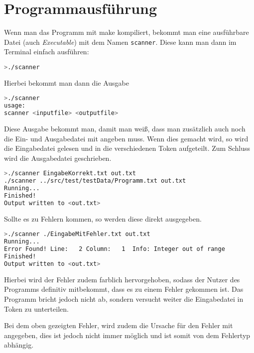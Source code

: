 \section{Programmausführung}
Wenn man das Programm mit make kompiliert, bekommt man eine ausführbare Datei (auch \textit{Executable}) mit dem Namen \texttt{scanner}. Diese kann man dann im Terminal einfach ausführen:

\begin{lstlisting}[language=bash,numbers=none]
>./scanner
\end{lstlisting}

Hierbei bekommt man dann die Ausgabe

\begin{lstlisting}[language=bash,numbers=none]
>./scanner
usage:
scanner <inputfile> <outputfile>
\end{lstlisting}

Diese Ausgabe bekommt man, damit man weiß, dass man zusätzlich auch noch die Ein- und Ausgabedatei mit angeben muss. Wenn dies gemacht wird, so wird die Eingabedatei gelesen und in die verschiedenen Token aufgeteilt. Zum Schluss wird die Ausgabedatei geschrieben.

\begin{lstlisting}[language=bash,numbers=none]
>./scanner EingabeKorrekt.txt out.txt
./scanner ../src/test/testData/Programm.txt out.txt
Running...
Finished!
Output written to <out.txt>
\end{lstlisting}

Sollte es zu Fehlern kommen, so werden diese direkt ausgegeben.
\begin{lstlisting}[language=bash,numbers=none]
>./scanner ./EingabeMitFehler.txt out.txt
Running...
Error Found! Line:   2 Column:   1  Info: Integer out of range
Finished!
Output written to <out.txt>
\end{lstlisting}

Hierbei wird der Fehler zudem farblich hervorgehoben, sodass der Nutzer des Programms definitiv mitbekommt, dass es zu einem Fehler gekommen ist. Das Programm bricht jedoch nicht ab, sondern versucht weiter die Eingabedatei in Token zu unterteilen.

Bei dem oben gezeigten Fehler, wird zudem die Ursache für den Fehler mit angegeben, dies ist jedoch nicht immer möglich und ist somit von dem Fehlertyp abhängig.
